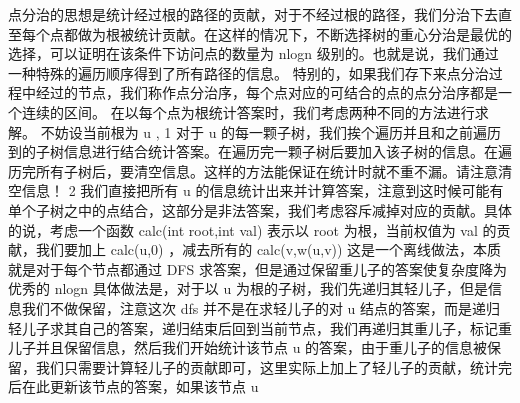 {}
\markdownRendererSectionEnd \markdownRendererSectionBegin
{}\markdownRendererInterblockSeparator
{}点分治的思想是统计经过根的路径的贡献，对于不经过根的路径，我们分治下去直至每个点都做为根被统计贡献。在这样的情况下，不断选择树的重心分治是最优的选择，可以证明在该条件下访问点的数量为\markdownRendererDollarSign{} nlogn \markdownRendererDollarSign{}级别的。也就是说，我们通过一种特殊的遍历顺序得到了所有路径的信息。\markdownRendererParagraphSeparator
{}特别的，如果我们存下来点分治过程中经过的节点，我们称作点分治序，每个点对应的可结合的点的点分治序都是一个连续的区间。\markdownRendererParagraphSeparator
{}在以每个点为根统计答案时，我们考虑两种不同的方法进行求解。\markdownRendererParagraphSeparator
{}不妨设当前根为\markdownRendererDollarSign{} u \markdownRendererDollarSign{},\markdownRendererParagraphSeparator
{}\markdownRendererDollarSign{} 1 \markdownRendererDollarSign{}对于\markdownRendererDollarSign{} u \markdownRendererDollarSign{}的每一颗子树，我们挨个遍历并且和之前遍历到的子树信息进行结合统计答案。在遍历完一颗子树后要加入该子树的信息。在遍历完所有子树后，要清空信息。这样的方法能保证在统计时就不重不漏。请注意清空信息！\markdownRendererParagraphSeparator
{}\markdownRendererDollarSign{} 2 \markdownRendererDollarSign{}我们直接把所有\markdownRendererDollarSign{} u \markdownRendererDollarSign{}的信息统计出来并计算答案，注意到这时候可能有单个子树之中的点结合，这部分是非法答案，我们考虑容斥减掉对应的贡献。具体的说，考虑一个函数\markdownRendererDollarSign{} calc(int\markdownRendererBackslash{} root,int\markdownRendererBackslash{} val) \markdownRendererDollarSign{}表示以\markdownRendererDollarSign{} root \markdownRendererDollarSign{}为根，当前权值为\markdownRendererDollarSign{} val \markdownRendererDollarSign{}的贡献，我们要加上\markdownRendererDollarSign{} calc(u,0) \markdownRendererDollarSign{}，减去所有的\markdownRendererDollarSign{} calc(v,w(u,v)) \markdownRendererDollarSign{}\markdownRendererInterblockSeparator
{}\markdownRendererInterblockSeparator
{}
\markdownRendererSectionEnd \markdownRendererSectionBegin
{}\markdownRendererInterblockSeparator
{}这是一个离线做法，本质就是对于每个节点都通过\markdownRendererDollarSign{} DFS \markdownRendererDollarSign{}求答案，但是通过保留重儿子的答案使复杂度降为优秀的\markdownRendererDollarSign{} nlogn \markdownRendererDollarSign{}\markdownRendererParagraphSeparator
{}具体做法是，对于以\markdownRendererDollarSign{} u \markdownRendererDollarSign{}为根的子树，我们先递归其轻儿子，但是信息我们不做保留，注意这次\markdownRendererDollarSign{} dfs \markdownRendererDollarSign{}并不是在求轻儿子的对\markdownRendererDollarSign{} u \markdownRendererDollarSign{}结点的答案，而是递归轻儿子求其自己的答案，递归结束后回到当前节点，我们再递归其重儿子，标记重儿子并且保留信息，然后我们开始统计该节点\markdownRendererDollarSign{} u \markdownRendererDollarSign{}的答案，由于重儿子的信息被保留，我们只需要计算轻儿子的贡献即可，这里实际上加上了轻儿子的贡献，统计完后在此更新该节点的答案，如果该节点\markdownRendererDollarSign{} u\markdownRendererSoftLineBreak
